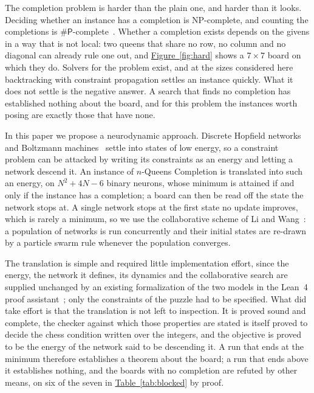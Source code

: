 \documentclass{easychair}
\newcommand{\citeref}[1]{\textcolor{academicpurple}{\cite{#1}}}
\newcommand{\tabref}[1]{\textcolor{academicpurple}{\hyperref[#1]{Table~\ref*{#1}}}}
\newcommand{\figref}[1]{\textcolor{academicpurple}{\hyperref[#1]{Figure~\ref*{#1}}}}
\begin{document}
The completion problem is harder than the plain one, and harder than it looks. Deciding whether an
instance has a completion is \textsf{NP}-complete, and counting the completions is
$\#\textsf{P}$-complete~\citeref{gent2017}. Whether a completion exists depends on the givens in a
way that is not local: two queens that share no row, no column and no diagonal can already rule one
out, and \figref{fig:hard} shows a $7 \times 7$ board on which they do. Solvers for the problem
exist, and at the sizes considered here backtracking with constraint propagation settles an instance
quickly. What it does not settle is the negative answer. A search that finds no completion has
established nothing about the board, and for this problem the instances worth posing are exactly
those that have none.

In this paper we propose a neurodynamic approach. Discrete Hopfield networks~\citeref{hopfield1982}
and Boltzmann machines~\citeref{ackley1985} settle into states of low energy, so a constraint problem
can be attacked by writing its constraints as an energy and letting a network descend it. An
instance of $n$-Queens Completion is translated into such an energy, on $N^{2} + 4N - 6$ binary
neurons, whose minimum is attained if and only if the instance has a completion; a board can then be
read off the state the network stops at. A single network stops at the first state no update
improves, which is rarely a minimum, so we use the collaborative scheme of Li and
Wang~\citeref{liwang2022}: a population of networks is run concurrently and their initial states are
re-drawn by a particle swarm rule whenever the population converges.

The translation is simple and required little implementation effort, since the energy, the network
it defines, its dynamics and the collaborative search are supplied unchanged by an existing
formalization of the two models in the Lean~4 proof assistant~\citeref{lean4,hnbm}; only the
constraints of the puzzle had to be specified. What did take effort is that the translation is not
left to inspection. It is proved sound and complete, the checker against which those properties are
stated is itself proved to decide the chess condition written over the integers, and the objective
is proved to be the energy of the network said to be descending it. A run that ends at the minimum
therefore establishes a theorem about the board; a run that ends above it establishes nothing, and
the boards with no completion are refuted by other means, on six of the seven in \tabref{tab:blocked}
by proof.
\end{document}
